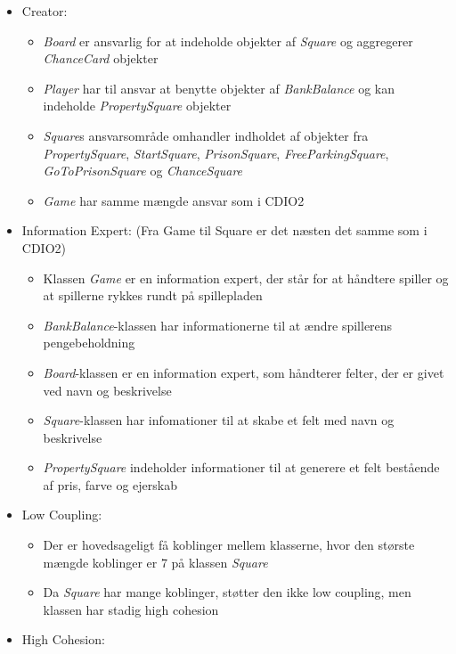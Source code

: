 \documentclass[../main.tex]{subfiles}
\begin{document}
\begin{flushleft}
\begin{itemize}
    \item Creator: 
    \begin{itemize}
        \item  \textit{Board} er ansvarlig for at indeholde objekter af \textit{Square} og aggregerer \textit{ChanceCard} objekter
        \item  \textit{Player} har til ansvar at benytte objekter af \textit{BankBalance} og kan indeholde \textit{PropertySquare} objekter
        \item \textit{Square}s ansvarsområde omhandler indholdet af objekter fra \textit{PropertySquare}, \textit{StartSquare}, \textit{PrisonSquare}, \textit{FreeParkingSquare}, \textit{GoToPrisonSquare} og \textit{ChanceSquare}
        \item \textit{Game} har samme mængde ansvar som i CDIO2
    \end{itemize}
    \item Information Expert: (Fra Game til Square er det næsten det samme som i CDIO2)
    \begin{itemize}
        \item Klassen \textit{Game} er en information expert, der står for at håndtere spiller og at spillerne rykkes rundt på spillepladen
        \item \textit{BankBalance}-klassen har informationerne til at ændre spillerens pengebeholdning
        \item \textit{Board}-klassen er en information expert, som håndterer felter, der er givet ved navn og beskrivelse
        \item \textit{Square}-klassen har infomationer til at skabe et felt med navn og beskrivelse
        \item \textit{PropertySquare} indeholder informationer til at generere et felt bestående af pris, farve og ejerskab
    \end{itemize}
    \item Low Coupling:
    \begin{itemize}
        \item Der er hovedsageligt få koblinger mellem klasserne, hvor den største mængde koblinger er 7 på klassen \textit{Square}
        \item Da \textit{Square} har mange koblinger, støtter den ikke low coupling, men klassen har stadig high cohesion
    \end{itemize}
    \item High Cohesion:
    \begin{itemize}

\end{itemize}
\end{itemize}
\end{flushleft}
\end{document}
